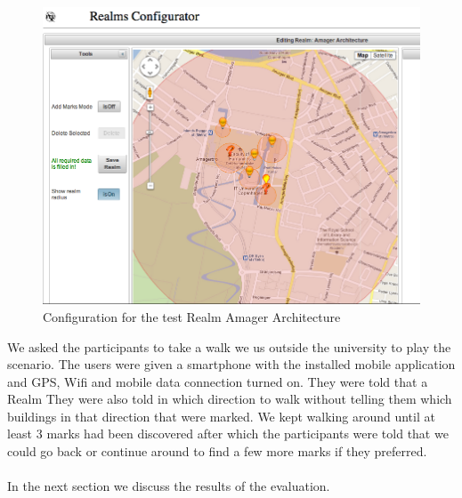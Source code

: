 \begin{figure}[ht]
	\centering
	\includegraphics[scale=1.0]{fig/amager_configuration}
	\caption{Configuration for the test Realm Amager Architecture}
	\label{fig.amager.arc}
\end{figure}

\noinden We asked the participants to take a walk we us outside the university to play the scenario. The users were given a smartphone with the installed mobile application and GPS, Wifi and mobile data connection turned on. They were told that a Realm They were also told in which direction to walk without telling them which buildings in that direction that were marked. We kept walking around until at least 3 marks had been discovered after which the participants were told that we could go back or continue around to find a few more marks if they preferred.
\\\\
In the next section we discuss the results of the evaluation.

